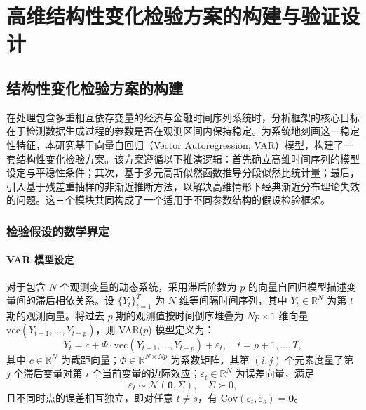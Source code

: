 
\chapter{高维结构性变化检验方案的构建与验证设计}\label{chap:method}

\section{结构性变化检验方案的构建}\label{sec:method-construction}

在处理包含多重相互依存变量的经济与金融时间序列系统时，分析框架的核心目标在于检测数据生成过程的参数是否在观测区间内保持稳定。为系统地刻画这一稳定性特征，本研究基于向量自回归（Vector Autoregression, VAR）模型，构建了一套结构性变化检验方案。该方案遵循以下推演逻辑：首先确立高维时间序列的模型设定与平稳性条件；其次，基于多元高斯似然函数推导分段似然比统计量；最后，引入基于残差重抽样的非渐近推断方法，以解决高维情形下经典渐近分布理论失效的问题。这三个模块共同构成了一个适用于不同参数结构的假设检验框架。

\subsection{检验假设的数学界定}\label{subsec:hypothesis}

\subsubsection{VAR 模型设定}

对于包含 $N$ 个观测变量的动态系统，采用滞后阶数为 $p$ 的向量自回归模型描述变量间的滞后相依关系。设 $\{Y_t\}_{t=1}^{T}$ 为 $N$ 维等间隔时间序列，其中 $Y_t \in \mathbb{R}^N$ 为第 $t$ 期的观测向量。将过去 $p$ 期的观测值按时间倒序堆叠为 $Np \times 1$ 维向量 $\mathrm{vec}(Y_{t-1}, \ldots, Y_{t-p})$，则 VAR($p$) 模型定义为：
\begin{equation}\label{eq:var-model}
    Y_t = c + \Phi \cdot \mathrm{vec}(Y_{t-1}, \ldots, Y_{t-p}) + \varepsilon_t, \quad t = p+1, \ldots, T,
\end{equation}
其中 $c \in \mathbb{R}^N$ 为截距向量；$\Phi \in \mathbb{R}^{N \times Np}$ 为系数矩阵，其第 $(i, j)$ 个元素度量了第 $j$ 个滞后变量对第 $i$ 个当前变量的边际效应；$\varepsilon_t \in \mathbb{R}^N$ 为误差向量，满足
\begin{equation}\label{eq:error-dist}
    \varepsilon_t \sim \mathcal{N}(\mathbf{0}, \Sigma), \quad \Sigma \succ 0,
\end{equation}
且不同时点的误差相互独立，即对任意 $t \neq s$，有 $\mathrm{Cov}(\varepsilon_t, \varepsilon_s) = \mathbf{0}$。

